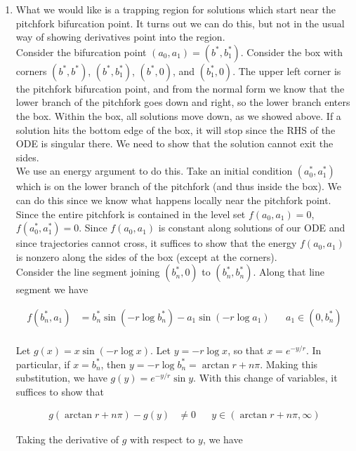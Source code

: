 \documentclass[12pt]{article}
\begin{document}
\begin{enumerate}
\item What we would like is a trapping region for solutions which start near the pitchfork bifurcation point. It turns out we can do this, but not in the usual way of showing derivatives point into the region.\\

Consider the bifurcation point $(a_0,a_1) = (b^*, b^*_1)$. Consider the box with corners $(b^*, b^*)$, $(b^*, b^*_1)$, $(b^*, 0)$, and $(b^*_1, 0)$. The upper left corner is the pitchfork bifurcation point, and from the normal form we know that the lower branch of the pitchfork goes down and right, so the lower branch enters the box. Within the box, all solutions move down, as we showed above. If a solution hits the bottom edge of the box, it will stop since the RHS of the ODE is singular there. We need to show that the solution cannot exit the sides.\\

We use an energy argument to do this. Take an initial condition $(a_0^*, a_1^*)$ which is on the lower branch of the pitchfork (and thus inside the box). We can do this since we know what happens locally near the pitchfork point. Since the entire pitchfork is contained in the level set $f(a_0, a_1) = 0$, $f(a_0^*, a_1^*) = 0$. Since $f(a_0, a_1)$ is constant along solutions of our ODE and since trajectories cannot cross, it suffices to show that the energy $f(a_0, a_1)$ is nonzero along the sides of the box (except at the corners).\\

Consider the line segment joining $(b^*_n, 0)$ to $(b^*_n, b^*_n)$. Along that line segment we have 

\begin{align*}
f(b^*_n, a_1) &= b^*_n \sin(-r \log b^*_n) - a_1 \sin(-r \log a_1) && a_1 \in (0, b^*_n)\\
\end{align*}

Let $g(x) = x \sin(-r \log x)$. Let $y = -r \log x$, so that $x = e^{-y/r}$. In particular, if $x = b^*_n$, then $y = -r \log b^*_n = \arctan r + n \pi$. Making this substitution, we have $g(y) = e^{-y/r} \sin y$. With this change of variables, it suffices to show that

\begin{align*}
g(\arctan r + n \pi) - g(y) &\neq 0 && y \in (\arctan r + n \pi, \infty) 
\end{align*}

Taking the derivative of $g$ with respect to $y$, we have


\end{enumerate}
\end{document}
